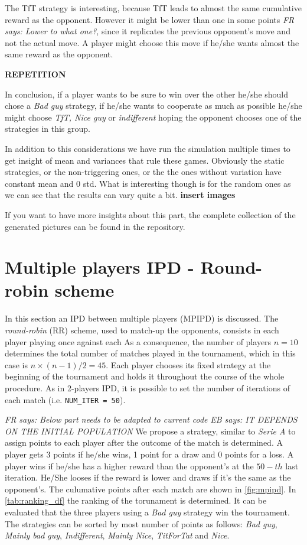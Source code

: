 \documentclass[journal,a4paper,10pt,twoside]{IEEEtran} %
\newcommand{\EB}[1]{\textit{\color{blue}EB says: #1}}
\newcommand{\FR}[1]{\textit{\color{ForestGreen}FR says: #1}}
\begin{document}
The TfT strategy is interesting, because TfT leads to almost the same cumulative reward as the opponent.
However it might be lower than one in some points \FR{Lower to \emph{what} one?}, since it replicates the previous opponent's move and not the actual move.
A player might choose this move if he/she wants almost the same reward as the opponent.

\textbf{REPETITION}

In conclusion, if a player wants to be sure to win over the other he/she should chose a \textit{Bad guy} strategy, if he/she wants to cooperate as much as possible he/she might choose \textit{TfT, Nice guy} or \textit{indifferent} hoping the opponent chooses one of the strategies in this group.     

In addition to this considerations we have run the simulation multiple times to get insight of mean and variances that rule these games. Obviously the static strategies, or the non-triggering ones, or the the ones without variation have constant mean and $0$ std. What is interesting though is for the random ones as we can see that the results can vary quite a bit.
\textbf{insert images}

If you want to have more insights about this part, the complete collection of the generated pictures can be found in the repository.


\section{Multiple players IPD - Round-robin scheme} \label{s:IPDMP}
In this section an IPD between multiple players (MPIPD) is discussed.
The \textit{round-robin} (RR) scheme, used to match-up the opponents, consists in each player playing once against each As a consequence, the number of players $n = 10$ determines the total number of matches played in the tournament, which in this case is ${n \times (n-1)}/{2} = 45$.
Each player chooses its fixed strategy at the beginning of the tournament and holds it throughout the course of the whole procedure.
As in 2-players IPD, it is possible to set the number of iterations of each match (i.e. \texttt{NUM\_ITER = 50}).

\FR{Below part needs to be adapted to current code}
\EB{IT DEPENDS ON THE INITIAL POPULATION}
We propose a strategy, similar to \textit{Serie A} to assign points to each player after the outcome of the match is determined. A player gets 3 points if he/she wins, 1 point for a draw and 0 points for a loss. A player wins if he/she has a higher reward than the opponent's at the $50-th$ last iteration. He/She looses if the reward is lower and draws if it's the same as the opponent's.
The culumative points after each match are shown in \autoref{fig:mpipd}.
In \autoref{tab:ranking_df} the ranking of the torunament is determined. It can be evaluated that the three players using a \textit{Bad guy} strategy win the tournament.
The strategies can be sorted by most number of points as follows: \textit{Bad guy}, \textit{Mainly bad guy}, \textit{Indifferent}, \textit{Mainly Nice}, \textit{TitForTat} and \textit{Nice}.
\end{document}
